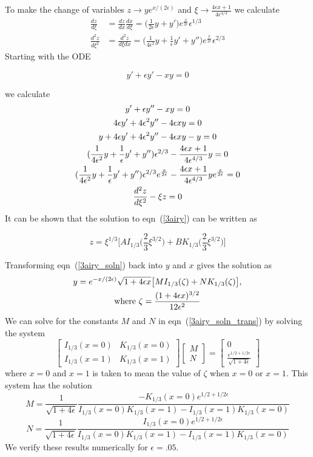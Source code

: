\documentclass[11pt]{article}
\newcommand{\eq}[1]{\begin{align*}#1\end{align*}}
\newcommand{\eqn}[2]{
  \begin{equation}
    \label{#1}
    #2
  \end{equation}
}
\newcommand{\eps}{\epsilon}
\newcommand{\eqr}[1]{eqn~(\ref{#1})}
\newcommand{\de}[2]{\frac{d #1}{d #2}}
\newcommand{\mat}[2]{\left[\begin{array}{#1}#2\end{array}\right]}
\begin{document}
\begin{description}
To make the change of variables $z \rightarrow ye^{x/(2\eps)}$ and $\xi \rightarrow \frac{4\eps x +1}{4\eps^{4/3}}$ we calculate
\eq{
  \de{z}{\xi} &= \de{z}{x}\de{x}{\xi} =
  \big(
    \frac{1}{2\eps}y + y'
  \big) e^{\frac{x}{2\eps}} \eps^{1/3}
  \\
  \de{^2 z}{\xi^2} &= \de{^2 z}{\xi dx} =
  \big(
    \frac{1}{4\eps^2} y
    + \frac{1}{\eps} y'
    + y''
  ) e^{\frac{x}{2\eps}} \eps^{2/3}
}
Starting with the ODE
\eqn{3ode}{
  y' + \eps y' - xy = 0
}
we calculate
\begin{gather}
\notag  y' + \eps y'' - xy = 0\\
\notag  4\eps y' + 4\eps^2 y'' - 4\eps xy = 0 \\
\notag  y + 4\eps y' + 4\eps^2 y'' - 4\eps xy - y = 0\\
\notag  (\frac{1}{4\eps^2}y + \frac{1}{\eps}y' + y'')\eps^{2/3}
        -
        \frac{4 \eps x + 1}{4\eps^{4/3}} y = 0\\
\notag  (\frac{1}{4\eps^2}y + \frac{1}{\eps}y' + y'')\eps^{2/3}e^{\frac{x}{2\eps}}
        -
        \frac{4 \eps x + 1}{4\eps^{4/3}} y e^{\frac{x}{2\eps}} = 0\\
\label{3airy}  \de{^2z}{\xi^2} - \xi z = 0
\end{gather}
It can be shown that the solution to \eqr{3airy} can be written as
\eqn{3airy_soln}{
  z = \xi^{1/3}\bigg[
    AI_{1/3}\bigg(
      \frac{2}{3} \xi^{3/2}
    \bigg)
    +
    BK_{1/3}\bigg(
      \frac{2}{3} \xi^{3/2}
    \bigg)
  \bigg]
}
Transforming \eqr{3airy_soln} back into $y$ and $x$ gives the solution as
\begin{gather}
  \label{3airy_soln_trans}
  y = e^{-x/(2\eps)} \sqrt{1+4\eps x}\big[
    MI_{1/3}(\zeta)
    +
    NK_{1/3}(\zeta)
  \big],
  \\
  \notag
  \text{where }
  \zeta = \frac{
    (1 + 4\eps x)^{3/2}
  }{
    12\eps^2
  }
\end{gather}
We can solve for the constants $M$ and $N$ in \eqr{3airy_soln_trans} by solving the system
$$
  \mat{cc}{
    I_{1/3}(x = 0) & K_{1/3}(x = 0) \\
    I_{1/3}(x = 1) & K_{1/3}(x = 1)
  }
  \mat{c}{
    M \\
    N
  }
  =
  \mat{c}{
    0 \\
    \frac{e^{1/2 + 1/2\eps}}{\sqrt{1 + 4\eps}}
  }
$$
where $x=0$ and $x=1$ is taken to mean the value of $\zeta$ when $x = 0$ or $x = 1$.
This system has the solution
$$
M = 
\frac{1}{\sqrt{1 + 4\eps}}
\frac{
  -K_{1/3}(x = 0) e^{1/2 + 1/2\eps}
}{
  I_{1/3}(x = 0)K_{1/3}(x = 1) - I_{1/3}(x = 1)K_{1/3}(x = 0)
}
$$
$$
N = 
\frac{1}{\sqrt{1 + 4\eps}}
\frac{
  I_{1/3}(x = 0) e^{1/2 + 1/2\eps}
}{
  I_{1/3}(x = 0)K_{1/3}(x = 1) - I_{1/3}(x = 1)K_{1/3}(x = 0)
}
$$
We verify these results numerically for $\eps = .05$.
\lstset{caption=Interactive Session for Numerical Results}



\end{description}
\end{document}
